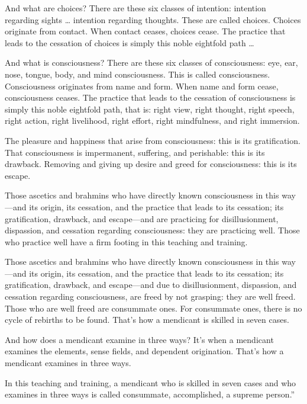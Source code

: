 \documentclass[12pt,openany]{book}%
\begin{document}
And what are choices? There are these six classes of intention: intention regarding sights … intention regarding thoughts. These are called choices. Choices originate from contact. When contact ceases, choices cease. The practice that leads to the cessation of choices is simply this noble eightfold path … 

And what is consciousness? There are these six classes of consciousness: eye, ear, nose, tongue, body, and mind consciousness. This is called consciousness. Consciousness originates from name and form. When name and form cease, consciousness ceases. The practice that leads to the cessation of consciousness is simply this noble eightfold path, that is: right view, right thought, right speech, right action, right livelihood, right effort, right mindfulness, and right immersion. 

The pleasure and happiness that arise from consciousness: this is its gratification. That consciousness is impermanent, suffering, and perishable: this is its drawback. Removing and giving up desire and greed for consciousness: this is its escape. 

Those ascetics and brahmins who have directly known consciousness in this way—and its origin, its cessation, and the practice that leads to its cessation; its gratification, drawback, and escape—and are practicing for disillusionment, dispassion, and cessation regarding consciousness: they are practicing well. Those who practice well have a firm footing in this teaching and training. 

Those ascetics and brahmins who have directly known consciousness in this way—and its origin, its cessation, and the practice that leads to its cessation; its gratification, drawback, and escape—and due to disillusionment, dispassion, and cessation regarding consciousness, are freed by not grasping: they are well freed. Those who are well freed are consummate ones. For consummate ones, there is no cycle of rebirths to be found. That’s how a mendicant is skilled in seven cases. 

And how does a mendicant examine in three ways? It’s when a mendicant examines the elements, sense fields, and dependent origination. That’s how a mendicant examines in three ways. 

In this teaching and training, a mendicant who is skilled in seven cases and who examines in three ways is called consummate, accomplished, a supreme person.” 
\end{document}
